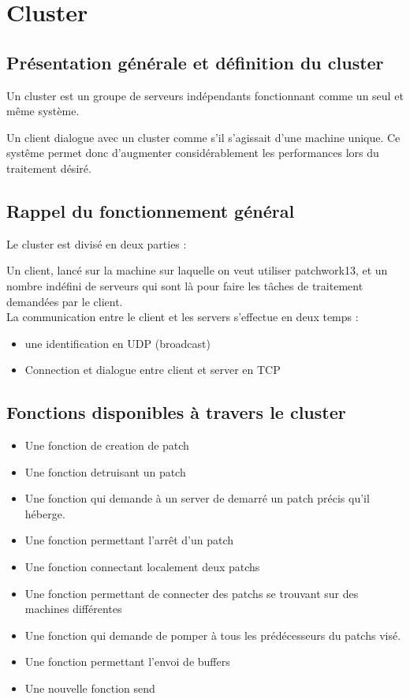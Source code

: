 \chapter{Cluster}

\section{Pr\'esentation g\'en\'erale et d\'efinition du cluster}

Un cluster est un groupe de serveurs ind\'ependants fonctionnant comme un seul
et m\^eme syst\`eme.

Un client dialogue avec un cluster comme s'il s'agissait
d'une machine unique. Ce syst\^eme permet donc d'augmenter consid\'erablement
les performances lors du traitement d\'esir\'e. \\

\section{Rappel du fonctionnement g\'en\'eral}

Le cluster est divis\'e en deux parties :

Un client, lanc\'e sur la machine sur laquelle on veut utiliser patchwork13, et
 un nombre ind\'efini de serveurs qui sont l\`a pour faire les t\^aches de 
traitement demand\'ees par le client. \\

La communication entre le client et les servers s'effectue en deux temps :

\begin{itemize}
\item une identification en UDP (broadcast)
\item Connection et dialogue entre client et server en TCP 
\end{itemize}

\section{Fonctions disponibles \`a travers le cluster}
\begin{itemize}
\item Une fonction de creation de patch
\item Une fonction detruisant un patch
\item Une fonction qui demande \`a un server de demarr\'e un patch pr\'ecis
qu'il h\'eberge.
\item Une fonction permettant l'arr\^et d'un patch
\item Une fonction connectant localement deux patchs 
\item Une fonction permettant de connecter des patchs se trouvant sur des 
machines diff\'erentes
\item Une fonction qui demande de pomper \`a tous les pr\'ed\'ecesseurs du 
patchs vis\'e.
\item Une fonction permettant l'envoi de buffers
\item Une nouvelle fonction send
\end{itemize}

